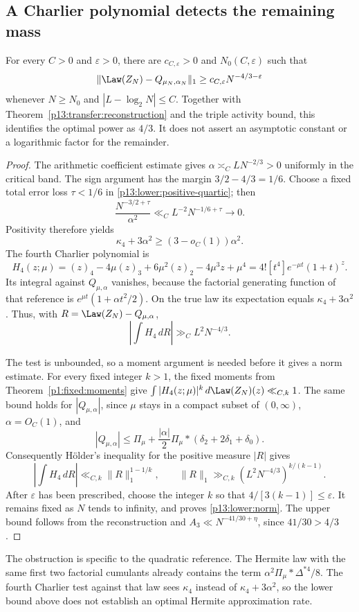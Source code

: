 \subsection{A Charlier polynomial detects the remaining mass}

\begin{theorem}
\label{p13:lower:optimal}
For every $C>0$ and $\varepsilon>0$, there are
$c_{C,\varepsilon}>0$ and $N_0(C,\varepsilon)$ such that
\begin{equation}
 \|\Law(Z_N)-Q_{\mu_N,\alpha_N}\|_1
 \geq c_{C,\varepsilon}N^{-4/3-\varepsilon}
 \label{p13:lower:norm}
\end{equation}
whenever $N\geq N_0$ and $|L-\log_2N|\leq C$.
Together with Theorem~\ref{p13:transfer:reconstruction} and the triple
activity bound, this identifies the optimal power as $4/3$.
It does not assert an asymptotic constant or a logarithmic factor for
the remainder.
\end{theorem}

\begin{proof}
The arithmetic coefficient estimate gives
$\alpha\asymp_C LN^{-2/3}>0$ uniformly in the critical band.
The sign argument has the margin $3/2-4/3=1/6$.
Choose a fixed total error loss $\tau<1/6$ in
\eqref{p13:lower:positive-quartic}; then
\[
 \frac{N^{-3/2+\tau}}{\alpha^2}
 \ll_C L^{-2}N^{-1/6+\tau}\longrightarrow0.
\]
Positivity therefore yields
\[
 \kappa_4+3\alpha^2\geq (3-o_C(1))\alpha^2.
\]
The fourth Charlier polynomial is
\[
 H_4(z;\mu)=(z)_4-4\mu(z)_3+6\mu^2(z)_2-4\mu^3z+\mu^4
          =4![t^4]e^{-\mu t}(1+t)^z.
\]
Its integral against $Q_{\mu,\alpha}$ vanishes, because the factorial
generating function of that reference is
$e^{\mu t}(1+\alpha t^2/2)$. On the true law its expectation equals
$\kappa_4+3\alpha^2$. Thus, with
$R=\Law(Z_N)-Q_{\mu,\alpha}$,
\[
 \left|\int H_4\,dR\right|\gg_C L^2N^{-4/3}.
\]

The test is unbounded, so a moment argument is needed before it gives
a norm estimate. For every fixed integer $k>1$, the fixed moments from
Theorem~\ref{p1:fixed:moments} give
$\int |H_4(z;\mu)|^k\,d\Law(Z_N)(z)\ll_{C,k}1$.
The same bound holds for $|Q_{\mu,\alpha}|$, since $\mu$ stays in a
compact subset of $(0,\infty)$, $\alpha=O_C(1)$, and
\[
 |Q_{\mu,\alpha}|
 \leq\Pi_\mu+\frac{|\alpha|}{2}
       \Pi_\mu*(\delta_2+2\delta_1+\delta_0).
\]
Consequently H\"older's inequality for the positive measure $|R|$ gives
\[
 \left|\int H_4\,dR\right|
 \ll_{C,k}\|R\|_1^{1-1/k},\qquad
 \|R\|_1\gg_{C,k}(L^2N^{-4/3})^{k/(k-1)}.
\]
After $\varepsilon$ has been prescribed, choose the integer $k$ so that
$4/[3(k-1)]\leq\varepsilon$. It remains fixed as $N$ tends to infinity,
and proves \eqref{p13:lower:norm}. The upper bound follows from the
reconstruction and $A_3\ll N^{-41/30+\eta}$, since $41/30>4/3$.
\end{proof}

The obstruction is specific to the quadratic reference. The Hermite law
with the same first two factorial cumulants already contains the term
$\alpha^2\Pi_\mu*\Delta^{*4}/8$. The fourth Charlier test against that
law sees $\kappa_4$ instead of $\kappa_4+3\alpha^2$, so the lower bound
above does not establish an optimal Hermite approximation rate.
